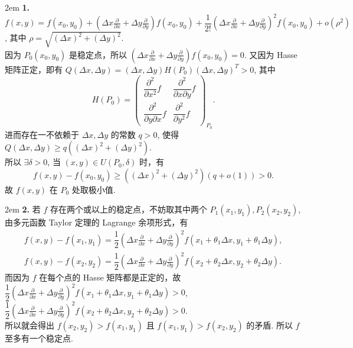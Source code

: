 \documentclass[UTF8,14pt,normal]{ctexart}
\begin{document}
    \hangindent 2em
    \noindent
    \textbf{1.} \(f(x, y) = f(x_0, y_0) + (\Delta x \frac{\partial}{\partial x} + \Delta y \frac{\partial}{\partial y}) f(x_0, y_0) + \dfrac{1}{2!} (\Delta x \frac{\partial}{\partial x} + \Delta y \frac{\partial}{\partial y})^2 f(x_0, y_0) + o(\rho^2)\), 其中 \(\rho = \sqrt{(\Delta x)^2 + (\Delta y)^2}\). \\
    因为 \(P_0 (x_0, y_0)\) 是稳定点，所以 \((\Delta x \frac{\partial}{\partial x} + \Delta y \frac{\partial}{\partial y}) f(x_0, y_0) = 0\). 又因为 Hasse 矩阵正定，即有 \(Q(\Delta x, \Delta y) = (\Delta x, \Delta y)H(P_0)(\Delta x, \Delta y)^T > 0\), 其中
    \[
        H(P_0) = \begin{pmatrix}
            \dfrac{\partial^2}{\partial x^2} f & \dfrac{\partial^2}{\partial x \partial y} f \\
            \dfrac{\partial^2}{\partial y \partial x} f & \dfrac{\partial^2}{\partial y^2} f
        \end{pmatrix}_{P_0}.
    \]
    进而存在一不依赖于 \(\Delta x, \Delta y\) 的常数 \(q > 0\), 使得 \(Q(\Delta x, \Delta y) \geqslant q ((\Delta x)^2 + (\Delta y)^2)\). \\
    所以 \(\exists \delta > 0\), 当 \((x, y) \in U(P_0, \delta)\) 时，有
    \[
        f(x, y) - f(x_0, y_0) \geqslant ((\Delta x)^2 + (\Delta y)^2) (q + o(1)) > 0.
    \]
    故 \(f(x, y)\) 在 \(P_0\) 处取极小值.

    \hangindent 2em
    \noindent
    \textbf{2.} 若 \(f\) 存在两个或以上的稳定点，不妨取其中两个 \(P_1(x_1, y_1), P_2(x_2, y_2)\), 由多元函数 Taylor 定理的 Lagrange 余项形式，有
    \begin{gather*}
        f(x, y) - f(x_1, y_1) = \dfrac{1}{2} (\Delta x \frac{\partial}{\partial x} + \Delta y \frac{\partial}{\partial y})^2 f(x_1 + \theta_1 \Delta x, y_1 + \theta_1 \Delta y), \\
        f(x, y) - f(x_2, y_2) = \dfrac{1}{2} (\Delta x \frac{\partial}{\partial x} + \Delta y \frac{\partial}{\partial y})^2 f(x_2 + \theta_2 \Delta x, y_2 + \theta_2 \Delta y).
    \end{gather*}
    而因为 \(f\) 在每个点的 Hasse 矩阵都是正定的，故 \(\dfrac{1}{2} (\Delta x \frac{\partial}{\partial x} + \Delta y \frac{\partial}{\partial y})^2 f(x_1 + \theta_1 \Delta x, y_1 + \theta_1 \Delta y) > 0\), \(\dfrac{1}{2} (\Delta x \frac{\partial}{\partial x} + \Delta y \frac{\partial}{\partial y})^2 f(x_2 + \theta_2 \Delta x, y_2 + \theta_2 \Delta y) > 0\). \\
    所以就会得出 \(f(x_2, y_2) > f(x_1, y_1)\) 且 \(f(x_1, y_1) > f(x_2, y_2)\) 的矛盾. 所以 \(f\) 至多有一个稳定点.
\end{document}
